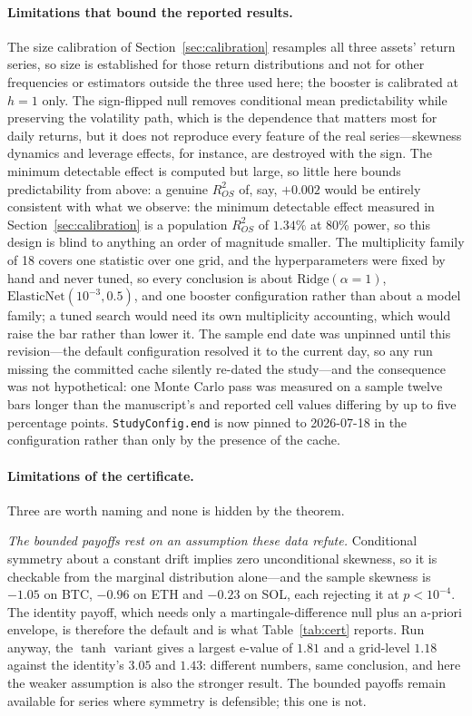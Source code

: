 \documentclass{article}
\theoremstyle{plain}
\theoremstyle{definition}
\newcommand{\rsq}{R^2_{OS}}
\begin{document}
\paragraph{Limitations that bound the reported results.}
The size calibration of Section~\ref{sec:calibration} resamples all three assets' return
series, so size is established for those return distributions and not for other frequencies or
estimators outside the three used here; the booster is calibrated at $h=1$ only. The sign-flipped null removes conditional mean
predictability while preserving the volatility path, which is the dependence that
matters most for daily returns, but it does not reproduce every feature of the real
series---skewness dynamics and leverage effects, for instance, are destroyed with
the sign. The minimum detectable effect is computed but large, so little here
bounds predictability from above: a genuine $\rsq$ of, say, $+0.002$ would be
entirely consistent with what we observe: the minimum detectable effect measured in
Section~\ref{sec:calibration} is a population $\rsq$ of $1.34\%$ at 80\% power, so this
design is blind to anything an order of magnitude smaller. The multiplicity family of 18 covers one
statistic over one grid, and the hyperparameters were fixed by hand and never tuned,
so every conclusion is about $\mathrm{Ridge}(\alpha{=}1)$,
$\mathrm{ElasticNet}(10^{-3}, 0.5)$, and one booster configuration rather than about
a model family; a tuned search would need its own multiplicity accounting, which
would raise the bar rather than lower it. The sample end date was unpinned until
this revision---the default configuration resolved it to the current day, so any run
missing the committed cache silently re-dated the study---and the consequence was not
hypothetical: one Monte Carlo pass was measured on a sample twelve bars longer than
the manuscript's and reported cell values differing by up to five percentage points.
\texttt{StudyConfig.end} is now pinned to 2026-07-18 in the configuration rather than
only by the presence of the cache.

\paragraph{Limitations of the certificate.} Three are worth naming and none is hidden by the
theorem.

\emph{The bounded payoffs rest on an assumption these data refute.} Conditional symmetry about
a constant drift implies zero unconditional skewness, so it is checkable from the marginal
distribution alone---and the sample skewness is $-1.05$ on BTC, $-0.96$ on ETH and $-0.23$ on
SOL, each rejecting it at $p<10^{-4}$. The identity payoff, which needs only a
martingale-difference null plus an a-priori envelope, is therefore the default and is what
Table~\ref{tab:cert} reports. Run anyway, the $\tanh$ variant gives a largest e-value of
$1.81$ and a grid-level $1.18$ against the identity's $3.05$ and $1.43$: different numbers,
same conclusion, and here the weaker assumption is also the stronger result. The bounded
payoffs remain available for series where symmetry is defensible; this one is not.
\end{document}
